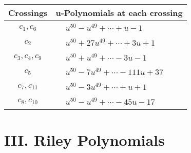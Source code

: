 \documentclass[1p]{elsarticle_modified}
\theoremstyle{definition}
\begin{document}
\begin{tabular}{m{50pt}|m{274pt}}
Crossings & \hspace{64pt}u-Polynomials at each crossing \\
\hline $$\begin{aligned}c_{1},c_{6}\end{aligned}$$&$\begin{aligned}
&u^{50}- u^{49}+\cdots+u-1
\end{aligned}$\\
\hline $$\begin{aligned}c_{2}\end{aligned}$$&$\begin{aligned}
&u^{50}+27 u^{49}+\cdots+3 u+1
\end{aligned}$\\
\hline $$\begin{aligned}c_{3},c_{4},c_{9}\end{aligned}$$&$\begin{aligned}
&u^{50}+u^{49}+\cdots-3 u-1
\end{aligned}$\\
\hline $$\begin{aligned}c_{5}\end{aligned}$$&$\begin{aligned}
&u^{50}-7 u^{49}+\cdots-111 u+37
\end{aligned}$\\
\hline $$\begin{aligned}c_{7},c_{11}\end{aligned}$$&$\begin{aligned}
&u^{50}-3 u^{49}+\cdots+u+1
\end{aligned}$\\
\hline $$\begin{aligned}c_{8},c_{10}\end{aligned}$$&$\begin{aligned}
&u^{50}- u^{49}+\cdots-45 u-17
\end{aligned}$\\
\hline
\end{tabular}\newpage\renewcommand{\arraystretch}{1}
\centering \section*{ III. Riley Polynomials}
\end{document}
